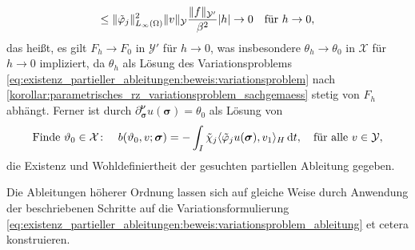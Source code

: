 \begin{Satz}
\begin{Beweis}
\begin{equation}
            \leq \lVert\tilde{\varphi}_{j}\rVert^{2}_{L_{\infty}(\Omega)} \lVert v\rVert_{\mathcal Y} \frac{\lVert f\rVert_{\mathcal Y'}}{\beta^{2}} \lvert h\rvert \to 0 \quad \text{für}~h \to 0,
        \end{equation}
        das heißt, es gilt $F_{h} \to F_{0}$ in $\mathcal Y'$ für $h \to 0$,
        was insbesondere $\theta_{h} \to \theta_{0}$ in $\mathcal X$ für $h \to 0$ impliziert, da $\theta_{h}$ als Lösung des Variationsproblems \cref{eq:existenz_partieller_ableitungen:beweis:variationsproblem} nach \cref{korollar:parametrisches_rz_variationsproblem_sachgemaess} stetig von $F_{h}$ abhängt.
        Ferner ist durch $\partial^{\bm\nu}_{\bm\sigma} u(\bm\sigma) = \theta_{0}$ als Lösung von
        \begin{equation}
            \label{eq:existenz_partieller_ableitungen:beweis:variationsproblem_ableitung}
            \text{Finde}~\theta_{0} \in \mathcal X \colon \quad b(\theta_{0}, v; \bm\sigma) = - \int_{I} \tilde{\chi}_{j} \skp{\tilde{\varphi}_{j}  u(\bm\sigma)}{v_{1}}{H} \diff t, \quad \fa v \in \mathcal Y,
        \end{equation}
        die Existenz und Wohldefiniertheit der gesuchten partiellen Ableitung gegeben.

        Die Ableitungen höherer Ordnung lassen sich auf gleiche Weise durch Anwendung der beschriebenen Schritte auf die Variationsformulierung \cref{eq:existenz_partieller_ableitungen:beweis:variationsproblem_ableitung} et cetera konstruieren.
    \end{Beweis}
\end{Satz}

